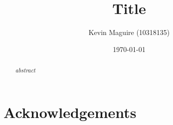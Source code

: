 \documentclass[floatfix,aps,prd,amsmath,amssymb]{revtex4}
\begin{document}
\title{Title}
\author{Kevin Maguire (10318135)}
\date{\today}

\begin{abstract}
\textit{abstract}
\end{abstract}

\maketitle
{}


\newpage

\tableofcontents
{}

\newpage
 
%
 
\section{Acknowledgements}
 
\begin{thebibliography}{10}
\end{thebibliography}
\end{document}
